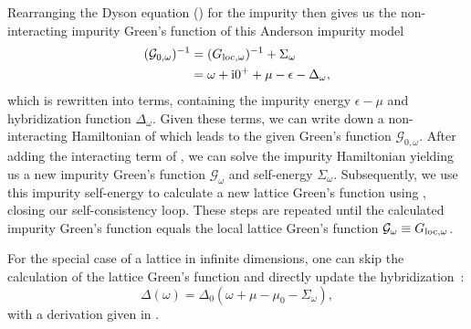Rearranging the Dyson equation () for the impurity
then gives us the non-interacting impurity Green's function of this Anderson impurity model
\begin{align}
    (\mathcal{G}_{0,\omega})^{-1}
     & =
    (G_{\mathrm{loc},\omega})^{-1} + \Sigma_\omega \\
     & =
    \omega + \mathrm{i}0^+ + \mu - \epsilon - \Delta_\omega,
\end{align}
which is rewritten into terms,
containing the impurity energy $\epsilon - \mu$ and hybridization function $\Delta_\omega$.
Given these terms, we can write down a non-interacting Hamiltonian
of  which leads to the given Green's function $\mathcal{G}_{0,\omega}$.
After adding the interacting term of ,
we can solve the impurity Hamiltonian
yielding us a new impurity Green's function $\mathcal{G}_\omega$
and self-energy $\Sigma_\omega$.
Subsequently,
we use this impurity self-energy to
calculate a new lattice Green's function using ,
closing our self-consistency loop.
These steps are repeated until the calculated impurity Green's function equals the local
lattice Green's function $\mathcal{G}_\omega \equiv G_{\mathrm{loc},\omega}$.

For the special case of a lattice in infinite dimensions,
one can skip the calculation of the lattice Green's function
and directly update the hybridization~\cite{Lu2014}:
\begin{equation}
    \Delta(\omega) = \Delta_{0}(\omega + \mu - \mu_0 - \Sigma_\omega),
    \label{eq:hybridization-update}
\end{equation}
with a derivation given in .
